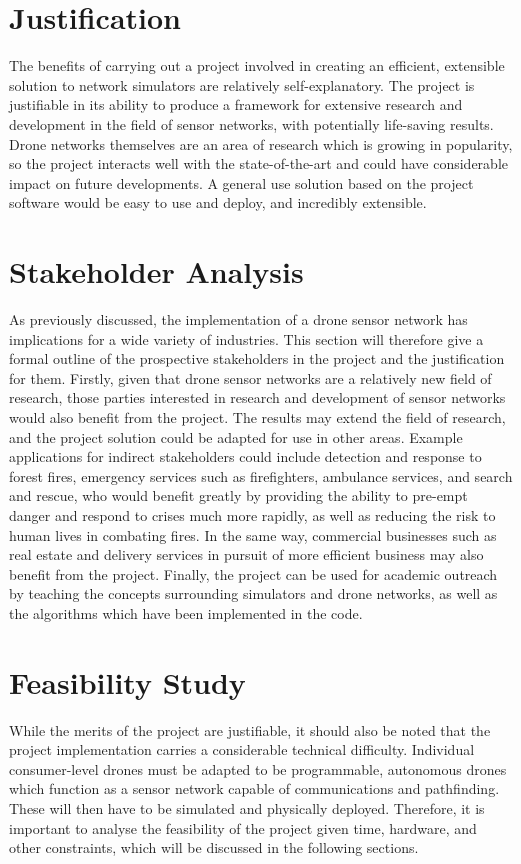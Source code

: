 \section{Justification}
The benefits of carrying out a project involved in creating an efficient, extensible solution to network simulators are relatively self-explanatory. The project is justifiable in its ability to produce a framework for extensive research and development in the field of sensor networks, with potentially life-saving results. Drone networks themselves are an area of research which is growing in popularity, so the project interacts well with the state-of-the-art and could have considerable impact on future developments. A general use solution based on the project software would be easy to use and deploy, and incredibly extensible.

\section{Stakeholder Analysis}
As previously discussed, the implementation of a drone sensor network has implications for a wide variety of industries. This section will therefore give a formal outline of the prospective stakeholders in the project and the justification for them. Firstly, given that drone sensor networks are a relatively new field of research, those parties interested in research and development of sensor networks would also benefit from the project. The results may extend the field of research, and the project solution could be adapted for use in other areas.  Example applications for indirect stakeholders could include detection and response to forest fires, emergency services such as firefighters, ambulance services, and search and rescue, who would benefit greatly by providing the ability to pre-empt danger and respond to crises much more rapidly, as well as reducing the risk to human lives in combating fires. In the same way, commercial businesses such as real estate and delivery services in pursuit of more efficient business may also benefit from the project. Finally, the project can be used for academic outreach by teaching the concepts surrounding simulators and drone networks, as well as the algorithms which have been implemented in the code.

\section{Feasibility Study}
While the merits of the project are justifiable, it should also be noted that the project implementation carries a considerable technical difficulty.  Individual consumer-level drones must be adapted to be programmable, autonomous drones which function as a sensor network capable of communications and pathfinding. These will then have to be simulated and physically deployed. Therefore, it is important to analyse the feasibility of the project given time, hardware, and other constraints, which will be discussed in the following sections.

